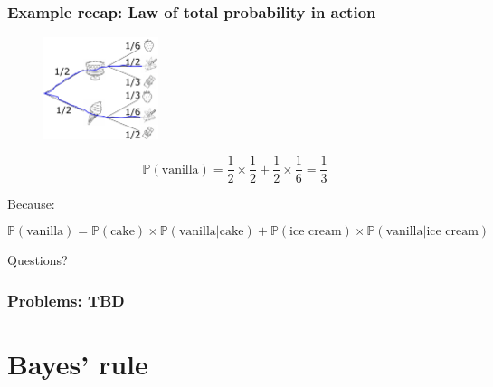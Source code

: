 \documentclass{beamer}
\begin{document}
	\begin{frame}
		\frametitle{Example recap: Law of total probability in action}
		
		\begin{figure}[ht]
			\centerline{\includegraphics[width=0.3\textwidth]{./figures/tree-prob-1-vanilla.pdf}}
		\end{figure}
		
		\begin{equation}
			\mathbb{P}(\text{vanilla}) = \frac{1}{2} \times \frac{1}{2} + \frac{1}{2} \times \frac{1}{6} = \frac{1}{3}
		\end{equation}
	
		Because:
		
		\begin{equation}
			\mathbb{P}(\text{vanilla}) = \mathbb{P}(\text{cake}) \times \mathbb{P}(\text{vanilla}|\text{cake})  +  \mathbb{P}(\text{ice cream}) \times \mathbb{P}(\text{vanilla}|\text{ice cream})
		\end{equation}
	
	\end{frame}

	\begin{frame}
		\Large Questions?
	\end{frame}

		\begin{frame}
		\frametitle{Problems: TBD}
		
	\end{frame}


	\section{Bayes' rule}
	\frame{\tableofcontents[currentsection]}
	
\end{document}
